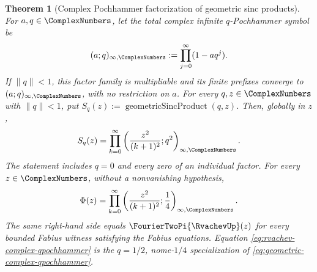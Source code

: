 \documentclass[11pt,oneside]{article}
\newtheorem{theorem}{Theorem}[section]
\theoremstyle{definition}
\theoremstyle{remark}
\begin{document}
\begin{theorem}[Complex Pochhammer factorization of geometric sinc products]
For \(a,q\in\ComplexNumbers\), let the total complex infinite \(q\)-Pochhammer symbol be
\begin{equation}
 (a;q)_{\infty,\ComplexNumbers}:=\prod_{j=0}^{\infty}(1-aq^j).
                                                               \label{eq:complex-qpochhammer-inf}
\end{equation}
If \(\lVert q\rVert<1\), this factor family is multipliable and its finite
prefixes converge to \((a;q)_{\infty,\ComplexNumbers}\), with no restriction on \(a\).
For every \(q,z\in\ComplexNumbers\) with \(\lVert q\rVert<1\), put
\(S_q(z):=\operatorname{geometricSincProduct}(q,z)\).  Then, globally in \(z\),
\begin{equation}
 S_q(z)=\prod_{k=0}^{\infty}
   \left(\frac{z^2}{(k+1)^2};q^2\right)_{\infty,\ComplexNumbers}.
                                                               \label{eq:geometric-complex-qpochhammer}
\end{equation}
The statement includes \(q=0\) and every zero of an individual factor.
For every \(z\in\ComplexNumbers\), without a nonvanishing hypothesis,
\begin{equation}
 \Phi(z)=\prod_{k=0}^{\infty}
   \left(\frac{z^2}{(k+1)^2};\frac14\right)_{\infty,\ComplexNumbers}.
                                                               \label{eq:rvachev-complex-qpochhammer}
\end{equation}
The same right-hand side equals \(\FourierTwoPi{\RvachevUp}(z)\) for every bounded
Fabius witness satisfying the Fabius equations.  Equation
\eqref{eq:rvachev-complex-qpochhammer} is the \(q=1/2\), nome-\(1/4\)
specialization of \eqref{eq:geometric-complex-qpochhammer}.
\end{theorem}
\end{document}
